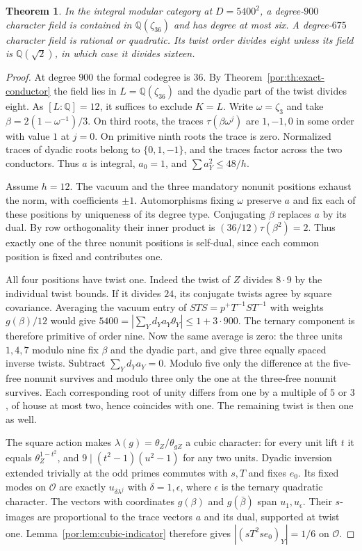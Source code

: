 \documentclass[11pt,a4paper]{article}
\numberwithin{equation}{section}
\newtheorem{theorem}{Theorem}[section]
\theoremstyle{remark}
\newcommand{\QQ}{\mathbb Q}
\begin{document}
\begin{theorem}\label{found:T:2.1}\label{found:T:key:thm:largest-degrees}\label{por:th:no-twelve}
In the integral modular category at $D=5400^2$, a degree-$900$ character field is contained in $\QQ(\zeta_{36})$ and has degree at most six. A degree-$675$ character field is rational or quadratic. Its twist order divides eight unless its field is $\QQ(\sqrt2)$, in which case it divides sixteen.
\end{theorem}
\begin{proof}
At degree $900$ the formal codegree is $36$. By Theorem~\ref{por:th:exact-conductor} the field lies in $L=\QQ(\zeta_{36})$ and the dyadic part of the twist divides eight. As $[L:\QQ]=12$, it suffices to exclude $K=L$. Write $\omega=\zeta_3$ and take $\beta=2(1-\omega^{-1})/3$. On third roots, the traces $\tau(\beta\omega^j)$ are $1,-1,0$ in some order with value $1$ at $j=0$. On primitive ninth roots the trace is zero. Normalized traces of dyadic roots belong to $\{0,1,-1\}$, and the traces factor across the two conductors. Thus $a$ is integral, $a_0=1$, and $\sum a_Y^2\le48/h$.

Assume $h=12$. The vacuum and the three mandatory nonunit positions exhaust the norm, with coefficients $\pm1$. Automorphisms fixing $\omega$ preserve $a$ and fix each of these positions by uniqueness of its degree type. Conjugating $\beta$ replaces $a$ by its dual. By row orthogonality their inner product is $(36/12)\tau(\beta^2)=2$. Thus exactly one of the three nonunit positions is self-dual, since each common position is fixed and contributes one.

All four positions have twist one. Indeed the twist of $Z$ divides $8\cdot9$ by the individual twist bounds. If it divides $24$, its conjugate twists agree by square covariance. Averaging the vacuum entry of $STS=p^+T^{-1}ST^{-1}$ with weights $g(\beta)/12$ would give $5400=|\sum_Y d_Ya_Y\theta_Y|\le1+3\cdot900$. The ternary component is therefore primitive of order nine. Now the same average is zero: the three units $1,4,7$ modulo nine fix $\beta$ and the dyadic part, and give three equally spaced inverse twists. Subtract $\sum_Y d_Y a_Y=0$. Modulo five only the difference at the five-free nonunit survives and modulo three only the one at the three-free nonunit survives. Each corresponding root of unity differs from one by a multiple of $5$ or $3$, of house at most two, hence coincides with one. The remaining twist is then one as well.

The square action makes $\lambda(g)=\theta_Z/\theta_{gZ}$ a cubic character: for every unit lift $t$ it equals $\theta_Z^{1-t^2}$, and $9\mid(t^2-1)(u^2-1)$ for any two units. Dyadic inversion extended trivially at the odd primes commutes with $s,T$ and fixes $e_0$. Its fixed modes on $\mathcal O$ are exactly $u_{\delta\lambda^j}$ with $\delta=1,\epsilon$, where $\epsilon$ is the ternary quadratic character. The vectors with coordinates $g(\beta)$ and $g(\bar\beta)$ span $u_1,u_\epsilon$. Their $s$-images are proportional to the trace vectors $a$ and its dual, supported at twist one. Lemma~\ref{por:lem:cubic-indicator} therefore gives $|(sT^2se_0)_Y|=1/6$ on $\mathcal O$.


\end{proof}
\end{document}
